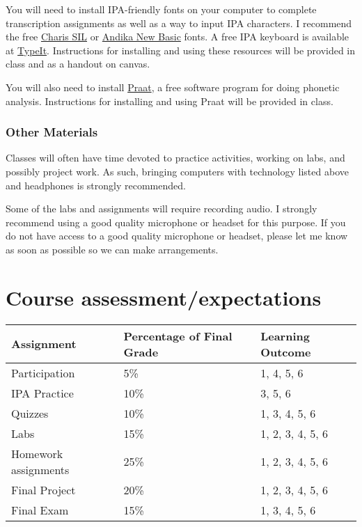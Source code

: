 \documentclass[12pt, letterpaper]{article}
\begin{document}
You will need to install IPA-friendly fonts on your computer to complete transcription assignments as well as a way to input IPA characters. I recommend the free \href{https://software.sil.org/charis/}{Charis SIL} or \href{https://software.sil.org/andika/}{Andika New Basic} fonts. A free IPA keyboard is available at \href{https://ipa.typeit.org/}{TypeIt}. Instructions for installing and using these resources will be provided in class and as a handout on canvas.

You will also need to install \href{https://www.fon.hum.uva.nl/praat/}{Praat}, a free software program for doing phonetic analysis. Instructions for installing and using Praat will be provided in class.

\subsubsection*{Other Materials} \label{sec:materials}

Classes will often have time devoted to practice activities, working on labs, and possibly project work. As such, bringing computers with technology listed above and headphones is strongly recommended.

Some of the labs and assignments will require recording audio. I strongly recommend using a good quality microphone or headset for this purpose. If you do not have access to a good quality microphone or headset, please let me know as soon as possible so we can make arrangements. 

\section*{Course assessment/expectations} \label{sec:course_structure}
\begin{center}
    \begin{tabular}{lll}
    \textbf{Assignment} & \textbf{Percentage of Final Grade} & \textbf{Learning Outcome} \\ \hline
    Participation & 5\% & 1, 4, 5, 6 \\
    IPA Practice  & 10\% & 3, 5, 6 \\
    Quizzes & 10\% & 1, 3, 4, 5, 6 \\
    Labs & 15\% & 1, 2, 3, 4, 5, 6 \\
    Homework assignments & 25\% & 1, 2, 3, 4, 5, 6 \\
    Final Project & 20\% & 1, 2, 3, 4, 5, 6 \\
    Final Exam & 15\% & 1, 3, 4, 5, 6 \\
\end{tabular}
\end{center}
\end{document}
